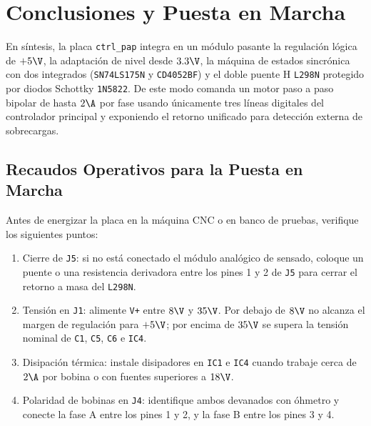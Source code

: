 \chapter{Conclusiones y Puesta en Marcha}
\label{sec:conclusiones}

En síntesis, la placa \texttt{ctrl\_pap} integra en un módulo pasante la regulación lógica de $+5\V$, la
adaptación de nivel desde $3.3\V$, la máquina de estados sincrónica con dos integrados (\texttt{SN74LS175N} y
\texttt{CD4052BF}) y el doble puente H \texttt{L298N} protegido por diodos Schottky \texttt{1N5822}. De este
modo comanda un motor paso a paso bipolar de hasta $2\A$ por fase usando únicamente tres líneas digitales del
controlador principal y exponiendo el retorno unificado para detección externa de sobrecargas.

\section{Recaudos Operativos para la Puesta en Marcha}
\label{sec:recaudos_operativos}

Antes de energizar la placa en la máquina CNC o en banco de pruebas, verifique los siguientes puntos:

\begin{enumerate}
  \item Cierre de \texttt{J5}: si no está conectado el módulo analógico de sensado, coloque un puente o una
    resistencia derivadora entre los pines 1 y 2 de \texttt{J5} para cerrar el retorno a masa del \texttt{L298N}.
  \item Tensión en \texttt{J1}: alimente \texttt{V+} entre $8\V$ y $35\V$. Por debajo de $8\V$ no alcanza el margen
    de regulación para $+5\V$; por encima de $35\V$ se supera la tensión nominal de \texttt{C1}, \texttt{C5},
    \texttt{C6} e \texttt{IC4}.
  \item Disipación térmica: instale disipadores en \texttt{IC1} e \texttt{IC4} cuando trabaje cerca de $2\A$ por
    bobina o con fuentes superiores a $18\V$.
  \item Polaridad de bobinas en \texttt{J4}: identifique ambos devanados con óhmetro y conecte la fase A entre los
    pines 1 y 2, y la fase B entre los pines 3 y 4.
\end{enumerate}
